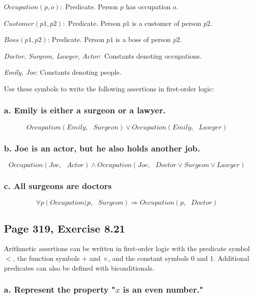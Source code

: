 \documentclass{article}
\begin{document}
$Occupation(p,o)$:\ Predicate. Person $p$ has occupation $o$.

$Customer\left( p1,p2\right) $:\ Predicate. Person $p1$ is a customer of
person $p2$.

$Boss\left( p1,p2\right) $: Predicate. Person $p1$ is a boss of person $p2$.

\textit{Doctor, Surgeon, Lawyer, Actor}:\textit{\ }Constants denoting
occupations.

\textit{Emily, Joe}: Constants denoting people.

Use these symbols to write the following assertions in first-order logic:

\subsubsection{a. Emily is either a surgeon or a lawyer.}

\[
Occupation(Emily,\text{ }Surgeon)\vee Occupation(Emily,\text{ }Lawyer)
\]

\subsubsection{b. Joe is an actor, but he also holds another job.}

\[
Occupation(Joe,\text{ }Actor)\wedge Occupation(Joe,\text{ }Doctor\vee
Surgeon\vee Lawyer)
\]

\subsubsection{c. All surgeons are doctors}

\[
\forall p\left( Occupation(p,\text{ }Surgeon\right) \Rightarrow Occupation(p,%
\text{ }Doctor)
\]

\subsection{Page 319, Exercise 8.21}

Arithmetic assertions can be written in first-order logic with the predicate
symbol $<$, the function symbols $+$ and $\times $, and the constant symbols 
$0$ and $1$. Additional predicates can also be defined with biconditionals.

\subsubsection{a. Represent the property "$x$ is an even number."}
\end{document}
